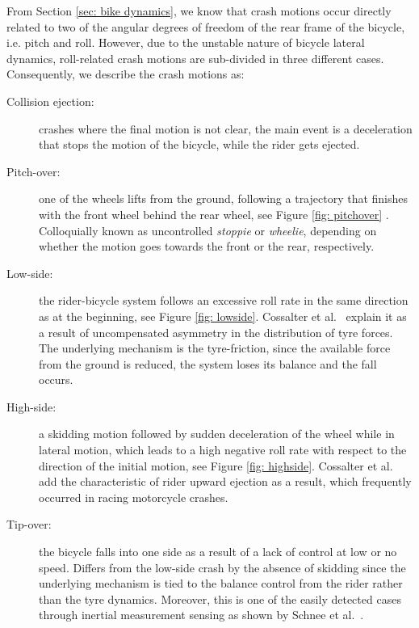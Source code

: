 \documentclass{article}
\begin{document}
From Section \ref{sec: bike dynamics}, we know that crash motions occur directly related to two of the angular degrees of freedom of the rear frame of the bicycle, i.e. pitch and roll.
%
However, due to the unstable nature of bicycle lateral dynamics, roll-related crash motions are sub-divided in three different cases.
%
Consequently, we describe the crash motions as:
%
\begin{description}
    \item [Collision ejection:] crashes where the final motion is not clear, the main event is a deceleration that stops the motion of the bicycle, while the rider gets ejected.

    \item [Pitch-over:] one of the wheels lifts from the ground, following a trajectory that finishes with the front wheel behind the rear wheel, see Figure \ref{fig: pitchover} \cite{Bec04, Bre10}.
    Colloquially known as uncontrolled \textit{stoppie} or \textit{wheelie}, depending on whether the motion goes towards the front or the rear, respectively.

    \item [Low-side:] the rider-bicycle system follows an excessive roll rate in the same direction as at the beginning, see Figure \ref{fig: lowside}. 
    Cossalter et al.~\cite{Cos07} explain it as a result of uncompensated asymmetry in the distribution of tyre forces.
    The underlying mechanism is the tyre-friction, since the available force from the ground is reduced, the system loses its balance and the fall occurs.

    \item [High-side:] a skidding motion followed by sudden deceleration of the wheel while in lateral motion, which leads to a high negative roll rate with respect to the direction of the initial motion, see Figure \ref{fig: highside}.
    Cossalter et al.~\cite{Cos07} add the characteristic of rider upward ejection as a result, which frequently occurred in racing motorcycle crashes.

    \item [Tip-over:] the bicycle falls into one side as a result of a lack of control at low or no speed. 
    Differs from the low-side crash by the absence of skidding since the underlying mechanism is tied to the balance control from the rider rather than the tyre dynamics.
    Moreover, this is one of the easily detected cases through inertial measurement sensing as shown by Schnee et al.~\cite{Sch21}.
\end{description}
\end{document}
